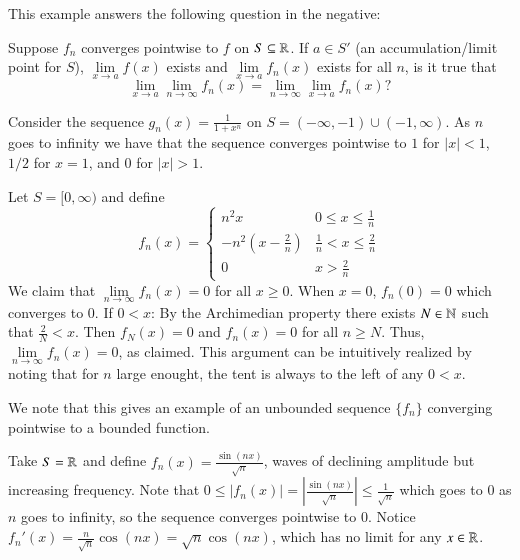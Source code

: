 This example answers the following question in the negative:

\begin{qst}
    Suppose $f_n$ converges pointwise to $f$ on $S \subseteq \mathbb R$. If $a \in S'$ (an accumulation/limit point for $S$), $\lim\limits_{x\rightarrow a}f(x)$ exists and $\lim\limits_{x\rightarrow a}f_n(x)$ exists for all $n$, is it true that \begin{equation*}
        \lim\limits_{x\rightarrow a}\lim\limits_{n\rightarrow \infty}f_n(x) = \lim\limits_{n\rightarrow \infty}\lim\limits_{x\rightarrow a}f_n(x)?
    \end{equation*}
\end{qst}


\begin{eg}
    Consider the sequence $g_n(x) = \frac{1}{1+x^n}$ on $S = (-\infty,-1)\cup(-1,\infty)$. As $n$ goes to infinity we have that the sequence converges pointwise to $1$ for $|x| < 1$, $1/2$ for $x = 1$, and $0$ for $|x| > 1$.
\end{eg}

\begin{eg}
    Let $S = [0,\infty)$ and define \begin{equation*}
        f_n(x) = \left\{\begin{array}{lc} n^2x & 0 \leq x \leq \frac{1}{n} \\ -n^2\left(x-\frac{2}{n}\right) & \frac{1}{n} < x \leq \frac{2}{n} \\ 0 & x > \frac{2}{n}\end{array}\right.
    \end{equation*}
    We claim that $\lim\limits_{n\rightarrow \infty}f_n(x) = 0$ for all $x \geq 0$. When $x=0$, $f_n(0) = 0$ which converges to $0$. If $0 < x$: By the Archimedian property there exists $N \in \mathbb N$ such that $\frac{2}{N} < x$. Then $f_N(x) = 0$ and $f_n(x) = 0$ for all $n \geq N$. Thus, $\lim\limits_{n\rightarrow \infty}f_n(x) = 0$, as claimed. This argument can be intuitively realized by noting that for $n$ large enought, the tent is always to the left of any $0 < x$.
\end{eg}

We note that this gives an example of an unbounded sequence $\{f_n\}$ converging pointwise to a bounded function.

\begin{eg}
    Take $S = \mathbb R$ and define $f_n(x) = \frac{\sin(nx)}{\sqrt{n}}$, waves of declining amplitude but increasing frequency. Note that $0 \leq |f_n(x)| = \left|\frac{\sin(nx)}{\sqrt{n}}\right| \leq \frac{1}{\sqrt{n}}$ which goes to $0$ as $n$ goes to infinity, so the sequence converges pointwise to $0$. Notice $f_n'(x) = \frac{n}{\sqrt{n}}\cos(nx) = \sqrt{n}\cos(nx)$, which has no limit for any $x \in \mathbb R$.
\end{eg}

